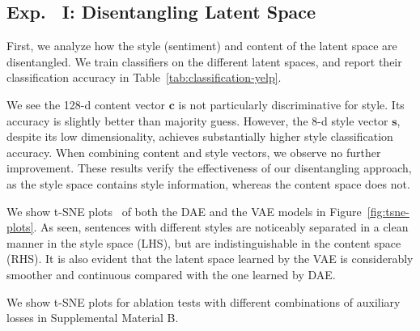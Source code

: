 \documentclass[11pt,a4paper]{article}
\begin{document}
\subsection{Exp.~ I: Disentangling Latent Space}

First, we analyze how the style (sentiment) and content of the latent space are disentangled.
We train classifiers on the different latent spaces, and report their classification accuracy in Table~\ref{tab:classification-yelp}.

We see the 128-d content vector $\bm c$ is not particularly discriminative for style.
Its accuracy is slightly better than majority guess.
However, the 8-d style vector $\bm s$, despite its low dimensionality, achieves substantially higher style classification accuracy.
When combining content and style vectors, we observe no further improvement.
These results verify the effectiveness of our disentangling approach, as the style space contains style information, whereas the content space does not.

We show t-SNE plots~\cite{maaten2008visualizing} of both the DAE and the VAE models in Figure~\ref{fig:tsne-plots}.
As seen, sentences with different styles are noticeably separated in a clean manner in the style space (LHS), but are indistinguishable in the content space (RHS).
It is also evident that the latent space learned by the VAE is considerably smoother and continuous compared with the one learned by DAE.

{\color{red} We show t-SNE plots for ablation tests with different combinations of auxiliary losses in Supplemental Material B.}
\end{document}
